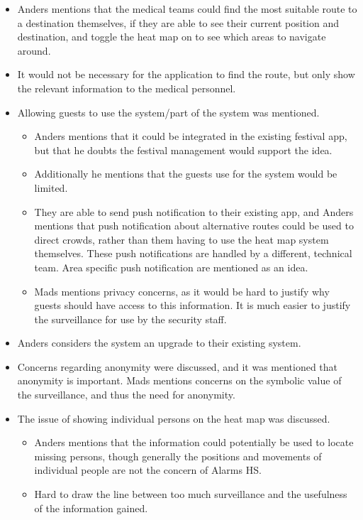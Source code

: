 \begin{itemize}
\begin{itemize}
    \end{itemize}
    \item Anders mentions that the medical teams could find the most suitable route to a destination themselves, if they are able to see their current position and destination, and toggle the heat map on to see which areas to navigate around.
    \item It would not be necessary for the application to find the route, but only show the relevant information to the medical personnel.
    \item Allowing guests to use the system/part of the system was mentioned.
     \begin{itemize}
        \item Anders mentions that it could be integrated in the existing festival app, but that he doubts the festival management would support the idea.
        \item Additionally he mentions that the guests use for the system would be limited.
        \item They are able to send push notification to their existing app, and Anders mentions that push notification about alternative routes could be used to direct crowds, rather than them having to use the heat map system themselves. These push notifications are handled by a different, technical team. Area specific push notification are mentioned as an idea.
        \item Mads mentions privacy concerns, as it would be hard to justify why guests should have access to this information. It is much easier to justify the surveillance for use by the security staff.
    \end{itemize}
    \item Anders considers the system an upgrade to their existing system.
    \item Concerns regarding anonymity were discussed, and it was mentioned that anonymity is important. Mads mentions concerns on the symbolic value of the surveillance, and thus the need for anonymity.
    \item The issue of showing individual persons on the heat map was discussed.
    \begin{itemize}
        \item Anders mentions that the information could potentially be used to locate missing persons, though generally the positions and movements of individual people are not the concern of Alarms HS.
        \item Hard to draw the line between too much surveillance and the usefulness of the information gained.

\end{itemize}
\end{itemize}
